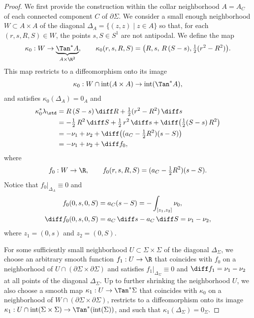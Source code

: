 \begin{proof}
We first provide the construction within the collar neighborhood $A=A_C$ of each connected component $C$ of $\partial\Sigma$.
We consider a small enough neighborhood $W\subset A\times A$ of the diagonal $\Delta_A=\{(z,z)\mid z\in A\}$ so that, for each $(r,s,R,S)\in W$, the points $s,S\in S^1$ are not antipodal. We define the map
\[
\kappa_0:W\to \underbrace{\Tan^*A}_{A\times \R^2},
\qquad
\kappa_0(r,s,R,S)=\big( R,s,\,R\,(S-s),\tfrac 12 (r^2-R^2) \big).
\]
This map restricts to a diffeomorphism onto its image
\[
\kappa_0:W\cap\mathrm{int}(A\times A)\to \mathrm{int}(\Tan^*A),
\]
and satisfies $\kappa_0(\Delta_A)=0_A$ and
\begin{align*}
\kappa_0^*\lambda_{\std}
&=
R\,(S-s)\,\diff R + \tfrac 12(r^2-R^2)\,\diff s\\
&=
-\tfrac 12\,R^2\,\diff S + \tfrac 12\,r^2\,\diff s + \diff\big( \tfrac 12(S-s)\,R^2 \big)\\
&=
-\nu_1+\nu_2+\diff\big( (a_C -\tfrac 12 R^2)(s-S) \big)\\
&=-\nu_1+\nu_2+\diff f_0,
\end{align*}
where
\[
f_0:W\to\R,\qquad f_0(r,s,R,S)=(a_C -\tfrac 12 R^2)(s-S).
\]
Notice that $f_0|_{\Delta_A}\equiv0$ and
\begin{align*}
f_0(0,s,0,S) & =a_C (s-S) = - \int_{[z_1,z_2]} \nu_0,
\\
\diff f_0(0,s,0,S) & = a_C \,\diff s-a_C\,\diff S = \nu_1-\nu_2,
\end{align*}
where $z_1=(0,s)$ and $z_2=(0,S)$.

For some sufficiently small neighborhood $U\subset\Sigma\times\Sigma$ of the diagonal $\Delta_\Sigma$, we choose an arbitrary smooth function $f_1:U\to\R$ that coincides with $f_0$ on a neighborhood of $U\cap(\partial\Sigma\times\partial\Sigma)$ and satisfies $f_1|_{\Delta_\Sigma}\equiv0$ and $\diff f_1=\nu_1-\nu_2$ at all points of the diagonal $\Delta_\Sigma$. Up to further shrinking the neighborhood $U$, we also choose a smooth map $\kappa_1:U\to\Tan^*\Sigma$ that coincides with $\kappa_0$ on a neighborhood of $W\cap(\partial\Sigma\times\partial\Sigma)$, restricts to a diffeomorphism onto its image $\kappa_1:U\cap\mathrm{int}(\Sigma\times\Sigma)\to\Tan^*(\mathrm{int}(\Sigma))$, and such that $\kappa_1(\Delta_\Sigma)=0_\Sigma$.


\end{proof}

